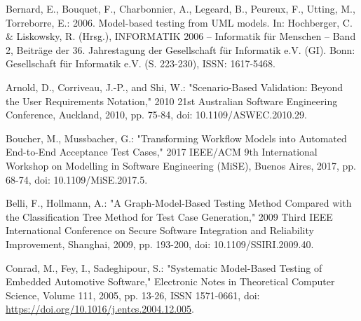 \documentclass[a4paper,10pt, bibliography=totocnumbered]{scrreprt}
\begin{document}
\begin{thebibliography}{9}
 Bernard, E., Bouquet, F., Charbonnier, A., Legeard, B., Peureux, F., Utting, M., Torreborre, E.: 2006. Model-based testing from UML models. In: Hochberger, C. \& Liskowsky, R. (Hrsg.), INFORMATIK 2006 – Informatik für Menschen – Band 2, Beiträge der 36. Jahrestagung der Gesellschaft für Informatik e.V. (GI). Bonn: Gesellschaft für Informatik e.V. (S. 223-230),  ISSN: 1617-5468.





 Arnold, D., Corriveau, J.-P., and Shi, W.: "Scenario-Based Validation: Beyond the User Requirements Notation," 2010 21st Australian Software Engineering Conference, Auckland, 2010, pp. 75-84, doi: 10.1109/ASWEC.2010.29.

 Boucher, M., Mussbacher, G.: "Transforming Workflow Models into Automated End-to-End Acceptance Test Cases," 2017 IEEE/ACM 9th International Workshop on Modelling in Software Engineering (MiSE), Buenos Aires, 2017, pp. 68-74, doi: 10.1109/MiSE.2017.5.



Belli, F., Hollmann, A.: "A Graph-Model-Based Testing Method Compared with the Classification Tree Method for Test Case Generation," 2009 Third IEEE International Conference on Secure Software Integration and Reliability Improvement, Shanghai, 2009, pp. 193-200, doi: 10.1109/SSIRI.2009.40.

Conrad, M., Fey, I., Sadeghipour, S.: "Systematic Model-Based Testing of Embedded
Automotive Software," Electronic Notes in Theoretical Computer Science, Volume 111, 2005, pp. 13-26, ISSN 1571-0661, doi: \url{https://doi.org/10.1016/j.entcs.2004.12.005}.


\end{thebibliography}

\listoffigures

\listoftables
\end{document}
